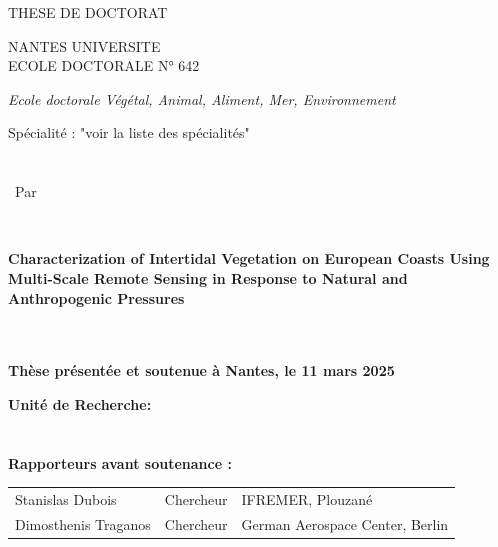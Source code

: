\begin{titlepage}
\AddToShipoutPictureBG*{%
    \BackgroundImage
}

\vspace{1.2cm}

{\LARGE {\Huge T}HESE DE DOCTORAT}

\vspace{1.8cm}
{\fontsize{14}{18}\selectfont NANTES UNIVERSITE} \\

{\large E}COLE {\large D}OCTORALE N° 642


{\fontsize{12}{16}\selectfont \textit{Ecole doctorale Végétal, Animal, Aliment, Mer, Environnement}}

{\fontsize{12}{16}\selectfont Spécialité : "voir la liste des spécialités"} \\\\\\

{\fontsize{12}{16}\ Par}
\vspace{0.2cm}

 \\

\parbox{17cm}{
{\fontsize{16}{20}\selectfont \textbf{Characterization of Intertidal Vegetation on European Coasts Using Multi-Scale Remote Sensing in Response to Natural and Anthropogenic Pressures} }
}\\\\

{\fontsize{11}{15}\selectfont \textbf{Thèse présentée et soutenue à Nantes, le 11 mars 2025}}

{\fontsize{11}{15}\selectfont \textbf{Unité de Recherche: }}
\\\\\\

{\fontsize{12}{16}\selectfont \textbf{Rapporteurs avant soutenance :}}

\begin{tabular}{@{}l l l@{}}
    {\fontsize{10}{14}\selectfont \textcolor{textgray}{Stanislas Dubois}} & 
    {\fontsize{10}{14}\selectfont \textcolor{textgray}{Chercheur}} & 
    {\fontsize{10}{14}\selectfont \textcolor{textgray}{IFREMER, Plouzané}} \\

    {\fontsize{10}{14}\selectfont \textcolor{textgray}{Dimosthenis Traganos}} & 
    {\fontsize{10}{14}\selectfont \textcolor{textgray}{Chercheur}} & 
    {\fontsize{10}{14}\selectfont \textcolor{textgray}{German Aerospace Center, Berlin}} \\


\end{tabular}
\end{titlepage}
